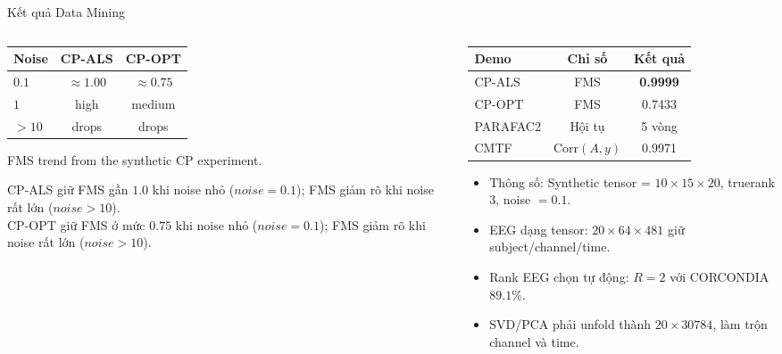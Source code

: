 \begin{frame}{Kết quả Data Mining}
\begin{columns}[T,totalwidth=\textwidth]
    \begin{column}{0.45\textwidth}
        \centering
        \small
        \renewcommand{\arraystretch}{1.12}
        \begin{tabular}{@{}lcc@{}}
        \toprule
        \textbf{Noise} & \textbf{CP-ALS} & \textbf{CP-OPT} \\
        \midrule
        $0.1$ & $\approx 1.00$ & $\approx 0.75$ \\
        $1$ & high & medium \\
        $>10$ & drops & drops \\
        \bottomrule
        \end{tabular}

        \vspace{0.12cm}
        \scriptsize FMS trend from the synthetic CP experiment.

        \vspace{0.1cm}
        CP-ALS giữ FMS gần $1.0$ khi noise nhỏ ($noise = 0.1$); FMS giảm rõ khi noise rất lớn ($noise > 10$). \\
        CP-OPT giữ FMS ở mức $0.75$ khi noise nhỏ ($noise = 0.1$); FMS giảm rõ khi noise rất lớn ($noise > 10$).
    \end{column}
    \begin{column}{0.51\textwidth}
        \small
        \renewcommand{\arraystretch}{1.15}
        \begin{tabular}{lcc}
        \toprule
        \textbf{Demo} & \textbf{Chỉ số} & \textbf{Kết quả} \\
        \midrule
        CP-ALS & FMS & \textbf{0.9999} \\
        CP-OPT & FMS & 0.7433 \\
        PARAFAC2 & Hội tụ & 5 vòng \\
        CMTF & Corr$(A,y)$ & 0.9971 \\
        \bottomrule
        \end{tabular}

        \vspace{0.05cm}
        \begin{itemize}\setlength\itemsep{0.1em}
            \item Thông số: Synthetic tensor =  $10\times15\times20$, truerank $3$, noise $=0.1$.
            \item EEG dạng tensor: $20\times64\times481$ giữ subject/channel/time.
            \item Rank EEG chọn tự động: $R=2$ với CORCONDIA $89.1\%$.
            \item SVD/PCA phải unfold thành $20\times30784$, làm trộn channel và time.
        \end{itemize}
    \end{column}
\end{columns}
\end{frame}

